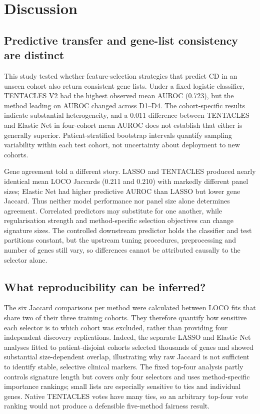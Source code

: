 \section{Discussion}
\label{sec:discussion}
\subsection{Predictive transfer and gene-list consistency are distinct}
\label{sec:discussion_tradeoff}
This study tested whether feature-selection strategies that predict CD in an unseen cohort also return consistent gene lists. Under a fixed logistic classifier, TENTACLES V2 had the highest observed mean AUROC (0.723), but the method leading on AUROC changed across D1--D4. The cohort-specific results indicate substantial heterogeneity, and a 0.011 difference between TENTACLES and Elastic Net in four-cohort mean AUROC does not establish that either is generally superior. Patient-stratified bootstrap intervals quantify sampling variability within each test cohort, not uncertainty about deployment to new cohorts.

Gene agreement told a different story. LASSO and TENTACLES produced nearly identical mean LOCO Jaccards (0.211 and 0.210) with markedly different panel sizes; Elastic Net had higher predictive AUROC than LASSO but lower gene Jaccard. Thus neither model performance nor panel size alone determines agreement. Correlated predictors may substitute for one another, while regularisation strength and method-specific selection objectives can change signature sizes. The controlled downstream predictor holds the classifier and test partitions constant, but the upstream tuning procedures, preprocessing and number of genes still vary, so differences cannot be attributed causally to the selector alone.

\subsection{What reproducibility can be inferred?}
\label{sec:discussion_reproducibility}
The six Jaccard comparisons per method were calculated between LOCO fits that share two of their three training cohorts. They therefore quantify how sensitive each selector is to which cohort was excluded, rather than providing four independent discovery replications. Indeed, the separate LASSO and Elastic Net analyses fitted to patient-disjoint cohorts selected thousands of genes and showed substantial size-dependent overlap, illustrating why raw Jaccard is not sufficient to identify stable, selective clinical markers. The fixed top-four analysis partly controls signature length but covers only four selectors and uses method-specific importance rankings; small lists are especially sensitive to ties and individual genes. Native TENTACLES votes have many ties, so an arbitrary top-four vote ranking would not produce a defensible five-method fairness result.

